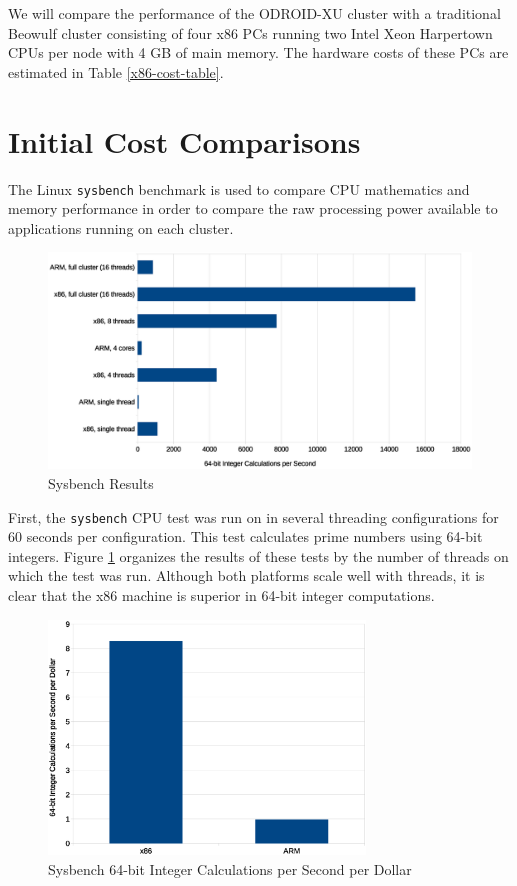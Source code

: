 \documentclass[11pt]{book}
\begin{document}
We will compare the performance of the ODROID-XU cluster with a traditional Beowulf
cluster consisting of four x86 PCs running two Intel Xeon Harpertown CPUs per node with 4 GB of main memory.
The hardware costs of these PCs are estimated in Table \ref{x86-cost-table}.

\section{Initial Cost Comparisons}

The Linux \verb;sysbench; benchmark is used to compare CPU mathematics and memory
performance in order to compare the raw processing power available to applications running
on each cluster.

\begin{figure}
\centering
\includegraphics[width=\textwidth]{sysbench_all}
\caption{Sysbench Results}
\label{sysbench-all}
\end{figure}

First, the \verb;sysbench; CPU test was run on in several threading configurations for 60
seconds per configuration.  This test calculates prime numbers using 64-bit
integers.  Figure \ref{sysbench-all} organizes the results of these tests by the number of
threads on which the test was run. Although both platforms scale well with threads, it is
clear that the x86 machine is superior in 64-bit integer computations.

\begin{figure}
\centering
\includegraphics[width=0.75\textwidth]{sysbench_cost}
\caption{Sysbench 64-bit Integer Calculations per Second per Dollar}
\label{sysbench-cost}
\end{figure}
\end{document}
